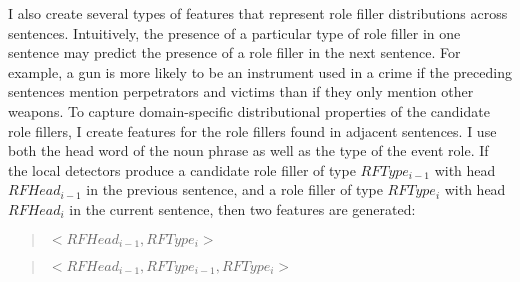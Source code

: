 
I also create several types of features that represent role filler distributions across sentences.
Intuitively, the presence of a particular type of role filler in one
sentence may predict the presence of a role filler in the next
sentence.
For example, a gun is more likely to be an instrument used
in a crime if the preceding sentences mention perpetrators and victims 
than if they only mention other weapons. 
To capture domain-specific distributional properties of the candidate role fillers,
I create features for the role fillers found in adjacent sentences.
I use both the head word of the noun phrase as well as the type of the event role. 
If the local detectors produce a candidate role filler of type
$RFType_{i-1}$ with head  $RFHead_{i-1}$ in the previous sentence, and
a role filler of type $RFType_{i}$ with head $RFHead_{i}$ in the
current  sentence, then two features are generated:
\vspace*{.08in}
\begin{quote}
{\it $<RFHead_{i-1}, RFType_{i}>$} 
\end{quote}
\begin{quote}
{\it $<RFHead_{i-1}, RFType_{i-1}, RFType_{i}>$}
\end{quote}
\vspace*{.08in}
